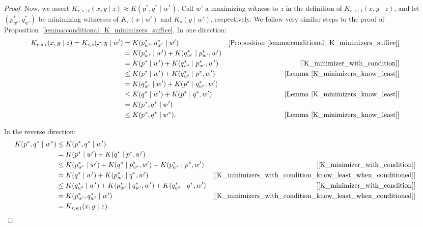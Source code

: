 \begin{proof}
    Now, we assert $K_{r, s \mid t}(x, y \mid z) \approx K(p^*, q^* \mid w^*)$. Call $w'$ a maximizing witness to $z$ in the definition of $K_{r, s \mid t}(x, y \mid z)$, and let $(p^*_{w'}, q^*_{w'})$ be minimizing witnesses of $K_r(x \mid w')$ and $K_{s}(y \mid w')$, respectively. We follow very similar steps to the proof of Proposition~\ref{lemma:conditional_K_minimizers_suffice}. In one direction:
    \begin{align*}
        K_{r, s \mid t}(x, y \mid z) = K_{r, s}(x, y \mid w') &= K(p^*_{w'}, q^*_{w'} \mid w') & [\text{Proposition~\ref{lemma:conditional_K_minimizers_suffice}}]\\
        &= K(p^*_{w'} \mid w') + K(q^*_{w'} \mid p^*_{w'}, w')\\
        &= K(p^* \mid w') + K(q^*_{w'} \mid p^*_{w'}, w') & [\text{\eqref{K_minimizer_with_condition}}]\\
        &\leq K(p^* \mid w') + K(q^*_{w'} \mid p^*, w') & [\text{Lemma~\ref{K_minimizers_know_least}}]\\
        &= K(q^*_{w'} \mid w') + K(p^* \mid q^*_{w'}, w')\\
        &\leq K(q^* \mid w') + K(p^* \mid q^*, w') & [\text{Lemma~\ref{K_minimizers_know_least}}]\\
        &= K(p^*, q^* \mid w')\\
        &\leq K(p^*, q^* \mid w^*). & [\text{Lemma~\ref{K_minimizers_know_least}}]
    \end{align*}

    In the reverse direction:
    \begin{align*}
        K(p^*, q^* \mid w^*) &\leq K(p^*, q^* \mid w')\\
        &= K(p^* \mid w') + K(q^* \mid p^*, w')\\
        &\leq K(p^*_{w'} \mid w') + K(q^* \mid p^*_{w'}, w') + K(p^*_{w'} \mid p^*, w') & [\text{\eqref{K_minimizer_with_condition}}]\\
        &= K(q^* \mid w') + K(p^*_{w'} \mid q^*, w') & [\text{\eqref{K_minimizers_with_condition_know_least_when_conditioned}}]\\
        &\leq K(q^*_{w'} \mid w') + K(p^*_{w'} \mid q^*_{w'}, w') + K(q^*_{w'} \mid q^*, w') & [\text{\eqref{K_minimizer_with_condition}}]\\
        &= K(p^*_{w'}, q^*_{w'} \mid w') & [\text{\eqref{K_minimizers_with_condition_know_least_when_conditioned}}]\\
        &= K_{r, s \mid t}(x, y \mid z).
    \end{align*}


\end{proof}
